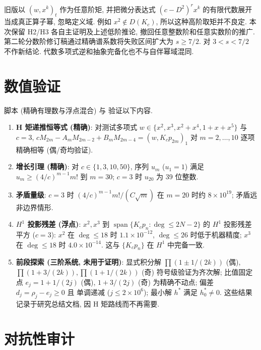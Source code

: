 \documentclass[UTF8]{ctexart}
\begin{document}
旧版以 $(w,x^k)_t$ 作为任意阶矩, 并把微分表达式
$(c-D^2)^r x^k$ 的有限代数展开当成真正算子幂, 忽略定义域.
例如 $x^2\notin D(K_c)$, 所以这种高阶取矩并不良定.
本次保留 H2/H3 各自主证明及上述低阶推论, 撤回任意整数阶和任意实数阶的推广.
第二轮分数阶修订稿通过精确谱系数将失败区间扩大为 $s\ge7/2$. 对 $3<s<7/2$ 不作新结论. 代数多项式逆和抽象完备化也不与自伴幂域混同.

\section{数值验证}

脚本  (精确有理数与浮点混合) 与
 验证以下内容.

\begin{enumerate}
	\item \textbf{H 矩递推恒等式 (精确)}: 对测试多项式 $w \in \{x^2, x^3,
		x^2+x^4, 1+x+x^5\}$ 与 $c = 3$,
		$c M_{2m} - A_m M_{2m-2} + B_m M_{2m-4} = (w, K_c p_{2m})_1$ 对
		$m = 2, \dots, 10$ 逐项精确相等 (偶/奇均验证).
	\item \textbf{增长引理 (精确)}: 对 $c \in \{1,3,10,50\}$, 序列
		$u_m$ ($u_1 = 1$) 满足 $u_m \geq (4/c)^{m-1} m!$ 到 $m = 30$;
		$c=3$ 时 $u_{20}$ 为 39 位整数.
	\item \textbf{矛盾量级}: $c=3$ 时 $(4/c)^{m-1}m! / (C\sqrt m)$ 在
		$m = 20$ 时约 $8\times10^{19}$; 矛盾远非边界情形.
	\item \textbf{$H^1$ 投影残差 (浮点)}: $x^2, x^3$ 到
		$\operatorname{span}\{K_c p_n : \deg \leq 2N-2\}$ 的 $H^1$ 投影残差平方
		($c=3$): $x^2$ 在 $\deg \leq 18$ 时 $1.1\times10^{-12}$, $\deg \leq 26$
		时低于机器精度; $x^3$ 在 $\deg \leq 18$ 时 $4.0\times10^{-14}$.
		这与 $\{K_c p_n\}$ 在 $H^1$ 中完备一致.
	\item \textbf{前段探索 (三阶系统, 未用于证明)}: 显式积分解
		$\prod(1 \pm 1/(2k))$ (偶), $\prod(1 + 3/(2k)), \prod(1+1/(2k))$ (奇)
		符号级验证为齐次解; 比值固定点 $e_j = 1+1/(2j)$ (偶),
		$1+3/(2j)$ (奇) 为精确不动点; 偏差 $d_j = \rho_j - e_j \geq 0$ 且
		单调递减 ($j \leq 2\times10^6$); 最小解 $h^*$ 满足 $h^*_0 \neq 0$.
		这些结果记录于研究总结文档, 因 H 矩路线而不再需要.
\end{enumerate}

\section{对抗性审计}
\end{document}
